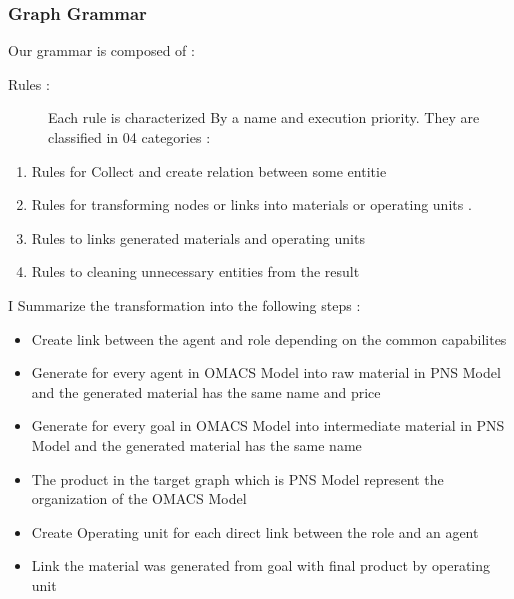 \subsubsection{ Graph Grammar }
Our grammar is composed of :
\begin{description}

\item [{Rules :}]  

Each rule is characterized
By a name and execution priority. They are classified in 04 categories :

\end{description}

\begin{enumerate}
\item Rules for Collect and create relation between some entitie
\item Rules for transforming nodes or links into materials or operating units .
\item Rules to links generated materials and operating units
\item Rules to cleaning unnecessary entities from the result 

\end{enumerate}
I Summarize the transformation into the following steps  : 

\begin{itemize}

\item Create link between the agent and role depending on the common capabilites

\item Generate for every agent in OMACS Model into raw material in PNS Model
and the generated material has the same name and price 

\item Generate for every goal in OMACS Model into intermediate material in PNS Model and the generated material has the same name  


\item The product in the target graph which is PNS Model represent the organization of the OMACS Model

\item Create Operating unit for each direct link between the role and an agent 

\item Link the material was generated from goal with final product by operating unit

\end{itemize}

